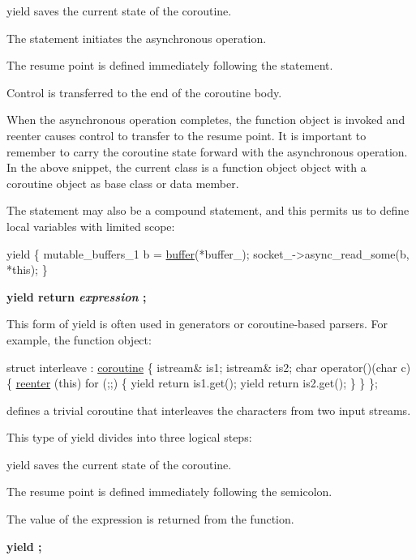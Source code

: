 \begin{DoxyItemize}
\item {\ttfamily yield} saves the current state of the coroutine. \item The statement initiates the asynchronous operation. \item The resume point is defined immediately following the statement. \item Control is transferred to the end of the coroutine body.\end{DoxyItemize}
When the asynchronous operation completes, the function object is invoked and {\ttfamily reenter} causes control to transfer to the resume point. It is important to remember to carry the coroutine state forward with the asynchronous operation. In the above snippet, the current class is a function object object with a coroutine object as base class or data member.

The statement may also be a compound statement, and this permits us to define local variables with limited scope\+:


\begin{DoxyCode}
 yield
\{
  mutable\_buffers\_1 b = \hyperlink{group__buffer_ga1ed66e401559cbfd19595392f653b47c}{buffer}(*buffer\_);
  socket\_->async\_read\_some(b, *\textcolor{keyword}{this});
\} 
\end{DoxyCode}


{\bfseries yield return {\itshape expression} ;}

This form of {\ttfamily yield} is often used in generators or coroutine-\/based parsers. For example, the function object\+:


\begin{DoxyCode}
 \textcolor{keyword}{struct }interleave : \hyperlink{classasio_1_1coroutine_aae689a0aee08699c9d68bdc9d246b5cb}{coroutine}
\{
  istream& is1;
  istream& is2;
  \textcolor{keywordtype}{char} operator()(\textcolor{keywordtype}{char} c)
  \{
    \hyperlink{yield_8hpp_a845826f234aec2b016cac4e60aff9bb5}{reenter} (\textcolor{keyword}{this}) for (;;)
    \{
      yield \textcolor{keywordflow}{return} is1.get();
      yield \textcolor{keywordflow}{return} is2.get();
    \}
  \}
\}; 
\end{DoxyCode}


defines a trivial coroutine that interleaves the characters from two input streams.

This type of {\ttfamily yield} divides into three logical steps\+:

\begin{DoxyItemize}
\item {\ttfamily yield} saves the current state of the coroutine. \item The resume point is defined immediately following the semicolon. \item The value of the expression is returned from the function.\end{DoxyItemize}
{\bfseries yield ;}


